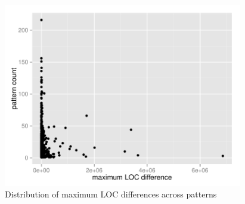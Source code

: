 \begin{figure}[H]
\caption{Distribution of maximum LOC differences across
patterns}\label{figure:pattern_loc_diff}
\centering
	\includegraphics[width=296pt]{images/pattern_LOC_diff_100.pdf}
\end{figure}